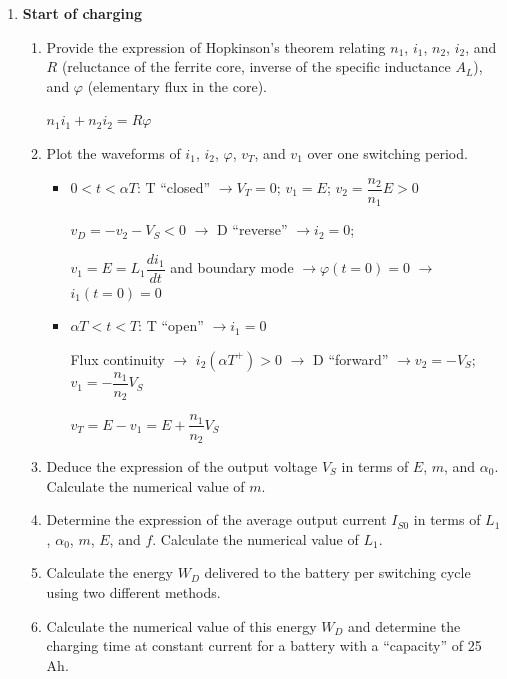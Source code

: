 \begin{enumerate}
\item \textbf{Start of charging}
\begin{enumerate}
\item Provide the expression of Hopkinson's theorem relating $n_1$, $i_1$, $n_2$, $i_2$, and $R$ (reluctance of the ferrite core, inverse of the specific inductance $A_L$), and $\varphi$ (elementary flux in the core).

\begin{center}
$n_1 i_1 + n_2 i_2 = R \varphi$
\end{center}

\item Plot the waveforms of $i_1$, $i_2$, $\varphi$, $v_T$, and $v_1$ over one switching period.

\begin{itemize}
    \item \underline{$0 < t < \alpha T$}: T ``closed'' $\rightarrow V_T = 0$; $v_1 = E$; $v_2 = \dfrac{n_2}{n_1} E > 0$
    
    $v_D=-v_2 - V_S < 0$ $\rightarrow$ D ``reverse'' $\rightarrow i_2 = 0$;
    
    $v_1 = E = L_1 \dfrac{di_1}{dt}$ and boundary mode $\rightarrow \varphi(t=0)=0$ $\rightarrow$ $i_1(t=0) = 0$

    \item \underline{$\alpha T < t < T$}: T ``open'' $\rightarrow i_1 = 0$
    
    Flux continuity $\rightarrow$ $i_2(\alpha T^+)>0$ $\rightarrow$ D ``forward'' $\rightarrow v_2 = -V_S$; $v_1 = -\dfrac{n_1}{n_2} V_S$
    
    $v_T = E - v_1 = E + \dfrac{n_1}{n_2} V_S$
\end{itemize}

\item Deduce the expression of the output voltage $V_S$ in terms of $E$, $m$, and $\alpha_0$. Calculate the numerical value of $m$.
\item Determine the expression of the average output current $I_{S0}$ in terms of $L_1$, $\alpha_0$, $m$, $E$, and $f$. Calculate the numerical value of $L_1$.
\item Calculate the energy $W_D$ delivered to the battery per switching cycle using two different methods.
\item Calculate the numerical value of this energy $W_D$ and determine the charging time at constant current for a battery with a ``capacity'' of 25 Ah.
\end{enumerate}


\end{enumerate}
